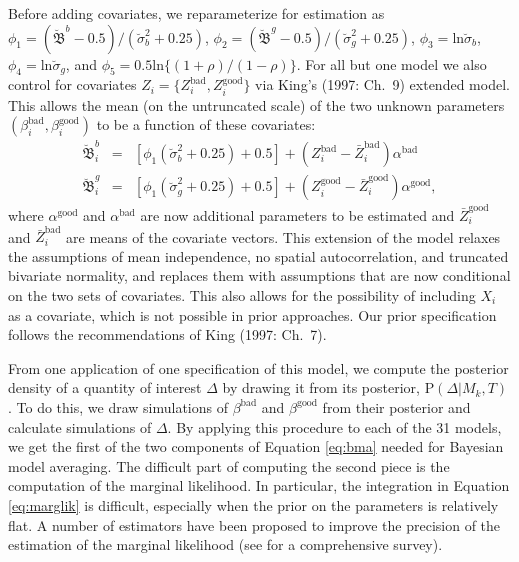 \documentclass[11pt,titlepage]{article}
\newcommand{\bbetau}{\breve{\mathfrak B}}
\newcommand{\sigmau}{\breve{\sigma}}
\renewcommand{\P}{\text{P}}
\newcommand{\bb}{\beta^{\text{bad}}}
\newcommand{\bg}{\beta^{\text{good}}}
\begin{document}
Before adding covariates, we reparameterize for estimation as
$\phi_1=(\bbetau^b-0.5)/(\sigmau_b^2+0.25)$,
$\phi_2=(\bbetau^g-0.5)/(\sigmau_g^2+0.25)$,
$\phi_3=\text{ln}\sigmau_b$, $\phi_4=\text{ln}\sigmau_g$, and
$\phi_5=0.5\text{ln}\{(1+\rho)/(1-\rho)\}$.  For all but one model we
also control for covariates
$Z_i=\{Z_i^{\text{bad}},Z_i^{\text{good}}\}$ via King's (1997: Ch.\ 9)
extended model.  This allows the mean (on the untruncated scale) of
the two unknown parameters $(\bb_i, \bg_i)$ to be a function of these
covariates:
\begin{eqnarray}
\bbetau_i^b & = & [\phi_1 (\sigmau^2_b + 0.25) + 0.5] + (Z_i^{\text{bad}} -
\bar{Z}_i^{\text{bad}}) \alpha^{\text{bad}} \\
\bbetau_i^g & = & [\phi_1 (\sigmau^2_g + 0.25) + 0.5] + (Z_i^{\text{good}} -
\bar{Z}_i^{\text{good}}) \alpha^{\text{good}},
\end{eqnarray}
where $\alpha^{\text{good}}$ and $\alpha^{\text{bad}}$ are now
additional parameters to be estimated and $\bar{Z}_i^{\text{good}}$
and $\bar{Z}_i^{\text{bad}}$ are means of the covariate vectors.  This
extension of the model relaxes the assumptions of mean independence,
no spatial autocorrelation, and truncated bivariate normality, and
replaces them with assumptions that are now conditional on the two
sets of covariates.  This also allows for the possibility of including
$X_i$ as a covariate, which is not possible in prior approaches.  Our
prior specification follows the recommendations of King (1997: Ch.\ 
7)\nocite{king:97}.

From one application of one specification of this model, we compute
the posterior density of a quantity of interest $\Delta$ by drawing it
from its posterior, $\P(\Delta|M_k,T)$.  To do this, we draw
simulations of $\bb$ and $\bg$ from their posterior and calculate
simulations of $\Delta$.  By applying this procedure to each of the 31
models, we get the first of the two components of Equation
\ref{eq:bma} needed for Bayesian model averaging.  The difficult part
of computing the second piece is the computation of the marginal
likelihood.  In particular, the integration in Equation
\ref{eq:marglik} is difficult, especially when the prior on the
parameters is relatively flat. A number of estimators have been
proposed to improve the precision of the estimation of the marginal
likelihood (see \citet{kass:raft:95} for a comprehensive survey).
\end{document}
